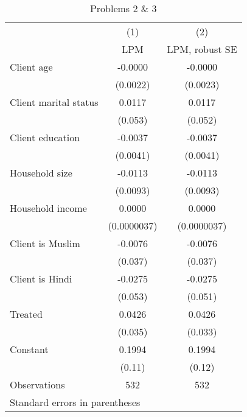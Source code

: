 \begin{table}[htbp]\centering
\caption{Problems 2 \& 3\label{q3}}
\begin{tabular}{l*{2}{c}}
\toprule
                    &\multicolumn{1}{c}{(1)}&\multicolumn{1}{c}{(2)}\\
                    &\multicolumn{1}{c}{LPM}&\multicolumn{1}{c}{LPM, robust SE}\\
\midrule
Client age          &     -0.0000&     -0.0000\\
                    &    (0.0022)&    (0.0023)\\
\addlinespace
Client marital status&      0.0117&      0.0117\\
                    &     (0.053)&     (0.052)\\
\addlinespace
Client education    &     -0.0037&     -0.0037\\
                    &    (0.0041)&    (0.0041)\\
\addlinespace
Household size      &     -0.0113&     -0.0113\\
                    &    (0.0093)&    (0.0093)\\
\addlinespace
Household income    &      0.0000&      0.0000\\
                    & (0.0000037)& (0.0000037)\\
\addlinespace
Client is Muslim    &     -0.0076&     -0.0076\\
                    &     (0.037)&     (0.037)\\
\addlinespace
Client is Hindi     &     -0.0275&     -0.0275\\
                    &     (0.053)&     (0.051)\\
\addlinespace
Treated             &      0.0426&      0.0426\\
                    &     (0.035)&     (0.033)\\
\addlinespace
Constant            &      0.1994&      0.1994\\
                    &      (0.11)&      (0.12)\\
\midrule
Observations        &         532&         532\\
\bottomrule
\multicolumn{3}{l}{\footnotesize Standard errors in parentheses}\\
\end{tabular}
\end{table}
